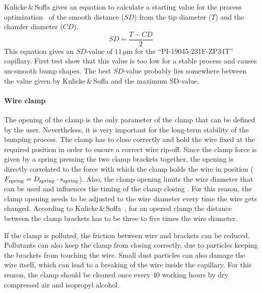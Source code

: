 Kulicke$\,\&\,$Soffa gives an equation to calculate a starting value for the process optimization~\cite{Kul05} of the smooth distance ($SD$) from the tip diameter ($T$) and the chamfer diameter ($CD$).
\begin{equation}\label{equ:SD_KnS}
SD=\frac{T-CD}{2}
\end{equation}
This equation gives an $SD$-value of $11\,\si{\micro \meter}$ for the ``PI-19045-231F-ZP34T'' capillary. First test show that this value is too low for a stable process and causes un-smooth bump shapes. The best $SD$-value probably lies somewhere between the value given by Kulicke$\,\&\,$Soffa and the maximum \acs{SD}-value.

\paragraph*{Wire clamp}
The opening of the clamp is the only parameter of the clamp that can be defined by the user. Nevertheless, it is very important for the long-term stability of the bumping process. The clamp has to close correctly and hold the wire fixed at the required position in order to ensure a correct wire rip-off. Since the clamp force is given by a spring pressing the two clamp brackets together, the opening is directly correlated to the force with which the clamp holds the wire in position ($F_{\rm{spring}}=D_{\rm{spring}}\cdot s_{\rm{spring}}$). Also, the clamp opening limits the wire diameter that can be used and influences the timing of the clamp closing \cite{Val13}. For this reason, the clamp opening needs to be adjusted to the wire diameter every time the wire gets changed. According to Kulicke$\,\&\,$Soffa~\cite{Rol14}, for an opened clamp the distance between the clamp brackets has to be three to five times the wire diameter.

If the clamp is polluted, the friction between wire and brackets can be reduced. Pollutants can also keep the clamp from closing correctly, due to particles keeping the brackets from touching the wire. Small dust particles can also damage the wire itself, which can lead to a breaking of the wire inside the capillary. For this reason, the clamp should be cleaned once every 40 working hours by dry compressed air and isopropyl alcohol. 

